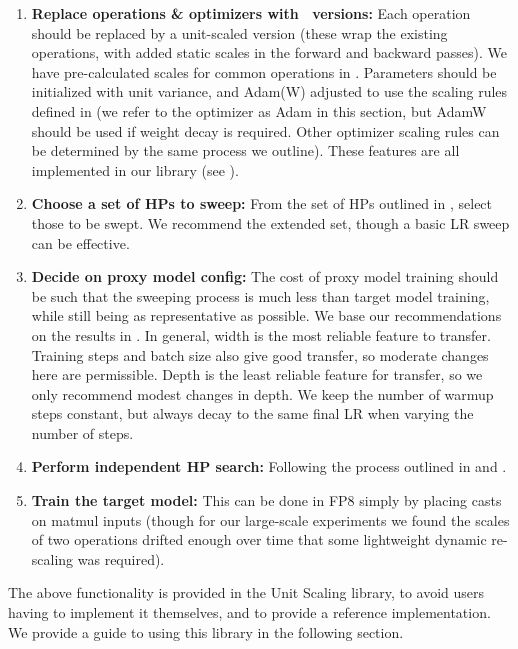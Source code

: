 \begin{enumerate}
    \item \textbf{Replace operations \& optimizers with \umup\ versions:}
    Each operation should be replaced by a unit-scaled version (these wrap the existing operations, with added static scales in the forward and backward passes). We have pre-calculated scales for common operations in . Parameters should be initialized with unit variance, and Adam(W) adjusted to use the scaling rules defined in  (we refer to the optimizer as Adam in this section, but AdamW should be used if weight decay is required. Other optimizer scaling rules can be determined by the same process we outline). These features are all implemented in our library (see ).

    \item \textbf{Choose a set of HPs to sweep:}
    From the set of HPs outlined in , select those to be swept. We recommend the extended set, though a basic LR sweep can be effective.
    
    \item \textbf{Decide on proxy model config:}
    The cost of proxy model training should be such that the sweeping process is much less than target model training, while still being as representative as possible. We base our recommendations on the results in . In general, width is the most reliable feature to transfer. Training steps and batch size also give good transfer, so moderate changes here are permissible. Depth is the least reliable feature for transfer, so we only recommend modest changes in depth. We keep the number of warmup steps constant, but always decay to the same final LR when varying the number of steps.
    
    \item \textbf{Perform independent HP search:}
    Following the process outlined in  and .
    
    \item \textbf{Train the target model:}
    This can be done in FP8 simply by placing casts on matmul inputs (though for our large-scale experiments we found the scales of two operations drifted enough over time that some lightweight dynamic re-scaling was required).
\end{enumerate}

The above functionality is provided in the Unit Scaling library, to avoid users having to implement it themselves, and to provide a reference implementation. We provide a guide to using this library in the following section.